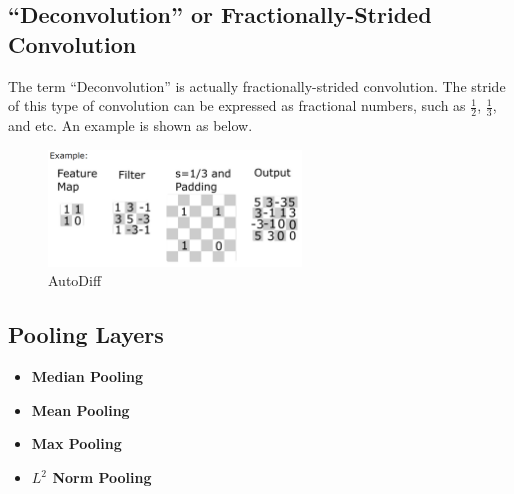 \documentclass[a4paper]{article}
\begin{document}
\subsection{``Deconvolution'' or Fractionally-Strided Convolution}

The term ``Deconvolution'' is actually fractionally-strided convolution. The stride of this type of convolution can be expressed as fractional numbers, such as $\frac{1}{2}$, $\frac{1}{3}$, and etc. An example is shown as below.
\begin{figure}[h]
	\centering
	\includegraphics[width=0.6\textwidth]{images/deconv.png}
	\caption{AutoDiff}
	\label{fig:deconv2d}
\end{figure}

\subsection{Pooling Layers}

\begin{itemize}
	\item \textbf{Median Pooling}
	\item \textbf{Mean Pooling}
	\item \textbf{Max Pooling}
	\item \textbf{$L^2$ Norm Pooling}
\end{itemize}






\end{document}
